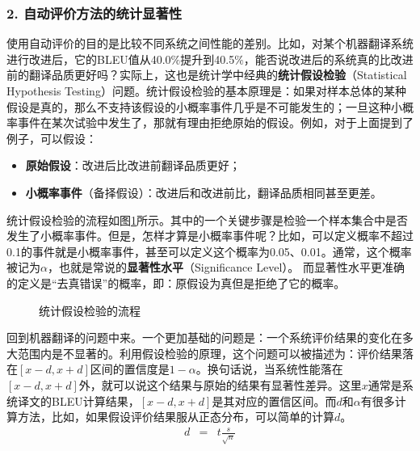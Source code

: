 \subsubsection{2. 自动评价方法的统计显著性}


\parinterval 使用自动评价的目的是比较不同系统之间性能的差别。比如，对某个机器翻译系统进行改进后，它的BLEU值从40.0$\%$提升到40.5$\%$，能否说改进后的系统真的比改进前的翻译品质更好吗？实际上，这也是统计学中经典的{\small\sffamily\bfseries{统计假设检验}}（Statistical Hypothesis Testing）问题。统计假设检验的基本原理是：如果对样本总体的某种假设是真的，那么不支持该假设的小概率事件几乎是不可能发生的；一旦这种小概率事件在某次试验中发生了，那就有理由拒绝原始的假设。例如，对于上面提到了例子，可以假设：

\begin{itemize}
\vspace{0.5em}
\item {\small\sffamily\bfseries{原始假设}}：改进后比改进前翻译品质更好；
\vspace{0.5em}
\item {\small\sffamily\bfseries{小概率事件}}（备择假设）：改进后和改进前比，翻译品质相同甚至更差。
\vspace{0.5em}
\end{itemize}

\parinterval 统计假设检验的流程如图\ref{fig:4-13}所示。其中的一个关键步骤是检验一个样本集合中是否发生了小概率事件。但是，怎样才算是小概率事件呢？比如，可以定义概率不超过0.1的事件就是小概率事件，甚至可以定义这个概率为0.05、0.01。通常，这个概率被记为$\alpha$，也就是常说的{\small\sffamily\bfseries{显著性水平}}（Significance Level）。 而显著性水平更准确的定义是“去真错误”的概率，即：原假设为真但是拒绝了它的概率。

\begin{figure}[htp]
    \centering
	
   \caption{统计假设检验的流程}
   \label{fig:4-13}
\end{figure}

\parinterval 回到机器翻译的问题中来。一个更加基础的问题是：一个系统评价结果的变化在多大范围内是不显著的。利用假设检验的原理，这个问题可以被描述为：评价结果落在$[x-d,x+d]$区间的置信度是$1-\alpha$。换句话说，当系统性能落在$[x-d, x+d]$外，就可以说这个结果与原始的结果有显著性差异。这里$x$通常是系统译文的BLEU计算结果，$[x-d,x+d]$是其对应的置信区间。而$d$和$\alpha$有很多计算方法，比如，如果假设评价结果服从正态分布，可以简单的计算$d$。
\begin{eqnarray}
d&=&t \frac{s}{\sqrt{n}}
\label{eq:4-21}
\end{eqnarray}

